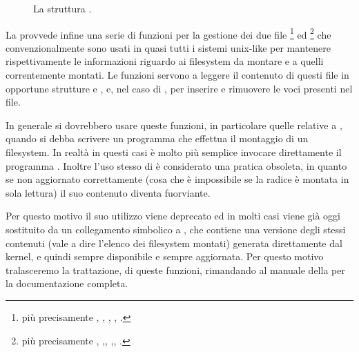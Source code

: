 \begin{figure}[!htb]
  \footnotesize \centering
  \begin{minipage}[c]{0.8\textwidth}
  \end{minipage}
  \normalsize 
  \caption{La struttura .} 
  \label{fig:sys_statfs}
\end{figure}


La  provvede infine una serie di funzioni per la gestione dei due
file \footnote{più precisamente ,
  , , , .}
ed \footnote{più precisamente ,
  ,, ,,
  .} che convenzionalmente sono usati in quasi tutti i
sistemi unix-like per mantenere rispettivamente le informazioni riguardo ai
filesystem da montare e a quelli correntemente montati. Le funzioni servono a
leggere il contenuto di questi file in opportune strutture  e
, e, nel caso di , per inserire e
rimuovere le voci presenti nel file.

In generale si dovrebbero usare queste funzioni, in particolare quelle
relative a , quando si debba scrivere un programma che
effettua il montaggio di un filesystem. In realtà in questi casi è molto più
semplice invocare direttamente il programma . Inoltre l'uso stesso
di  è considerato una pratica obsoleta, in quanto se non
aggiornato correttamente (cosa che è impossibile se la radice è montata in
sola lettura) il suo contenuto diventa fuorviante.

Per questo motivo il suo utilizzo viene deprecato ed in molti casi viene già
oggi sostituito da un collegamento simbolico a , che
contiene una versione degli stessi contenuti (vale a dire l'elenco dei
filesystem montati) generata direttamente dal kernel, e quindi sempre
disponibile e sempre aggiornata. Per questo motivo tralasceremo la
trattazione, di queste funzioni, rimandando al manuale della 
\cite{GlibcMan} per la documentazione completa.



